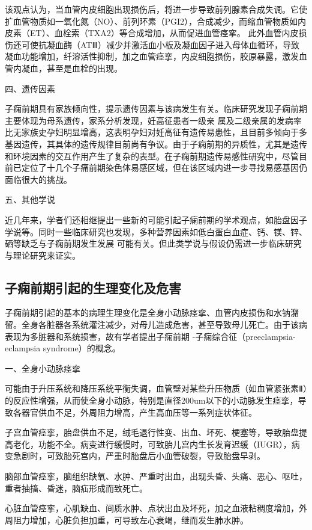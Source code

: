 该观点认为，当血管内皮细胞出现损伤后，将进一步导致前列腺素合成失调\cite{OAG9,Sibai2005}。它使扩血管物质如一氧化氮（NO）、前列环素（PGI2），合成减少，而缩血管物质如内皮素（ET）、血栓索（TXA2）等合成增加，从而促进血管痉挛。
此外血管内皮损伤还可使抗凝血酶（ATⅢ）减少并激活血小板及凝血因子进入母体血循环，导致凝血功能增加，纤溶活性抑制，加之血管痉挛，内皮细胞损伤，胶原暴露，激发血管内凝血，甚至是血栓的出现。

四、遗传因素

子痫前期具有家族倾向性，提示遗传因素与该病发生有关\cite{OAG9,Sibai2005}。临床研究发现子痫前期主要体现为母系遗传，家系分析发现\cite{Ge2013}，妊高征患者一级亲
属及二级亲属的发病率比无家族史孕妇明显增高，这表明孕妇对妊高征有遗传易患性，且目前多倾向于多基因遗传，其具体的遗传规律目前尚有争议。由于子痫前期的异质性，尤其是遗传
和环境因素的交互作用产生了复杂的表型。在子痫前期遗传易感性研究中，尽管目前已定位了十几个子痛前期染色体易感区域，但在该区域内进一步寻找易感基因仍面临很大的挑战。

五、其他学说

近几年来，学者们还相继提出一些新的可能引起子痫前期的学术观点，如胎盘因子学说\cite{Shi2006}等。同时一些临床研究也发现，多种营养因素如低白蛋白血症、钙、镁、锌、硒等缺乏与子痫前期发生发展
可能有关\cite{OAG9}。但此类学说与假设仍需进一步临床研究与理论研究来证实。

\subsection{子痫前期引起的生理变化及危害}
子痫前期引起的基本的病理生理变化是全身小动脉痉挛、血管内皮损伤和水钠潴留。全身各脏器各系统灌注减少，对母儿造成危害，甚至导致母儿死亡。由于该病表现为多脏器和系统损害，故有学者提出子痫前期
-子痫综合征（preeclampsia-eclampsia syndrome）的概念。

一、全身小动脉痉挛　

可能由于升压系统和降压系统平衡失调，血管壁对某些升压物质（如血管紧张素Ⅱ）的反应性增强，从而使全身小动脉，特别是直径200um以下的小动脉发生痉挛，导致各器官供血不足，外周阻力增高，产生高血压等一系列症状体征。

子宫血管痉挛，胎盘供血不足，绒毛退行性变、出血、坏死、梗塞等，导致胎盘提高老化，功能不全。病变进行缓慢时，可致胎儿宫内生长发育迟缓（IUGR），病变急剧时，可致胎死宫内，严重时胎盘后小血管破裂，导致胎盘早剥。

脑部血管痉挛，脑组织缺氧、水肿、严重时出血，出现头昏、头痛、恶心、呕吐，重者抽搐、昏迷，脑疝形成而致死亡。

心脏血管痉挛，心肌缺血、间质水肿、点状出血及坏死，加之血液粘稠度增加，外周阻力增加，心脏负担加重，可导致左心衰竭，继而发生肺水肿。

